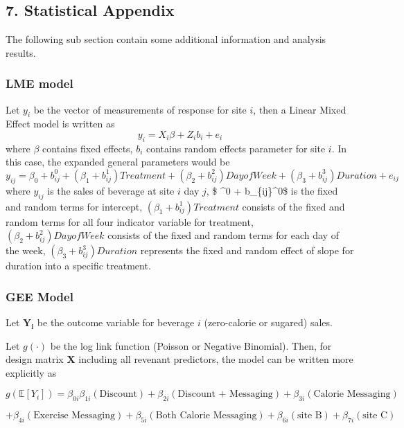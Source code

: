 \documentclass[
]{article}
\begin{document}
\hypertarget{statistical-appendix}{%
\subsection{7. Statistical Appendix}\label{statistical-appendix}}

The following sub section contain some additional information and
analysis results.

\hypertarget{lme-model}{%
\subsubsection{LME model}\label{lme-model}}

Let \(y_i\) be the vector of measurements of response for site \(i\),
then a Linear Mixed Effect model is written as
\[y_i = X_i\beta + Z_i b_i + e_i\] where \(\beta\) contains fixed
effects, \(b_i\) contains random effects parameter for site \(i\). In
this case, the expanded general parameters would be
\[y_{ij}  = \beta_0 + b_{ij}^0 + (\beta_1 + b_{ij}^1)Treatment + (\beta_2 + b_{ij}^2)Day of Week +(\beta_3 + b_{ij}^3)Duration +e_{ij}\]
where \(y_{ij}\) is the sales of beverage at site \(i\) day \(j\), \$
\beta\^{}0 + b\_\{ij\}\^{}0\$ is the fixed and random terms for
intercept, \((\beta_1 + b_{ij}^1)Treatment\) consists of the fixed and
random terms for all four indicator variable for treatment,
\((\beta_2 + b_{ij}^2)Day of Week\) consists of the fixed and random
terms for each day of the week, \((\beta_3 + b_{ij}^3)Duration\)
represents the fixed and random effect of slope for duration into a
specific treatment.

\hypertarget{gee-model}{%
\subsubsection{GEE Model}\label{gee-model}}

Let \(\mathbf{Y_i}\) be the outcome variable for beverage \(i\)
(zero-calorie or sugared) sales.

Let \(g(\cdot)\) be the log link function (Poisson or Negative
Binomial). Then, for design matrix \(\mathbf{X}\) including all revenant
predictors, the model can be written more explicitly as

\[
g(\mathbb{E}[Y_i]) = \beta_{0i} \beta_{1i} (\text{Discount}) + \beta_{2i} (\text{Discount + Messaging}) + \beta_{3i} (\text{Calorie Messaging}) 
\]

\[
+ \beta_{4i} (\text{Exercise Messaging}) + \beta_{5i} (\text{Both Calorie Messaging}) + \beta_{6i} (\text{site B}) + \beta_{7i} (\text{site C})
\]
\end{document}
